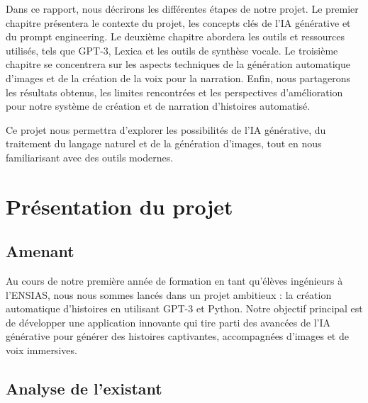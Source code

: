 \documentclass[11,5pt]{report}
\begin{document}
\begin{spacing}{2}
\begin{onehalfspace}
Dans ce rapport, nous décrirons les différentes étapes de notre projet. Le premier chapitre présentera le contexte du projet, les concepts clés de l'IA générative et du prompt engineering\cite{PromptGuide}. Le deuxième chapitre abordera les outils et ressources utilisés, tels que GPT-3, Lexica\cite{Lexica} et les outils de synthèse vocale.
Le troisième chapitre se concentrera sur les aspects techniques de la génération automatique d'images et de la création de la voix pour la narration. Enfin, nous partagerons les résultats obtenus, les limites rencontrées et les perspectives d'amélioration pour notre système de création et de narration d'histoires automatisé.

Ce projet nous permettra d'explorer les possibilités de l'IA générative, du traitement du langage naturel et de la génération d'images, tout en nous familiarisant avec des outils modernes.
\end{onehalfspace}


\chapter{Présentation du projet}
\section{Amenant}

\par 
Au cours de notre première année de formation en tant qu'élèves ingénieurs à l'ENSIAS, nous nous sommes lancés dans un projet ambitieux : la création automatique d'histoires en utilisant GPT-3 et Python. Notre objectif principal est de développer une application innovante qui tire parti des avancées de l'IA générative pour générer des histoires captivantes, accompagnées d'images et de voix immersives.

\section{Analyse de l'existant}


\end{spacing}
\end{document}
